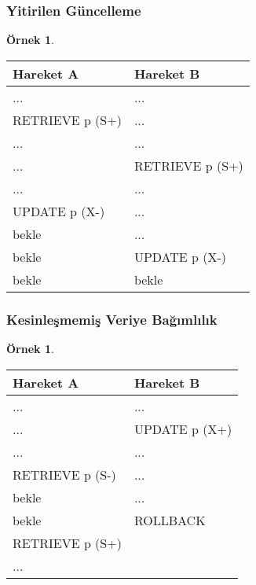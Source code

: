 \documentclass[dvipsnames]{beamer}
\theoremstyle{definition}
\theoremstyle{example}
\newtheorem{ornek}[theorem]{Örnek}
\theoremstyle{plain}
\begin{document}
\begin{frame}[fragile]
  \frametitle{Yitirilen Güncelleme}

  \begin{ornek}
    \begin{table}
      \begin{tabular}{ll}
Hareket A       & Hareket B      \\\hline
...             & ...            \\\pause
RETRIEVE p (S+) & ...            \\\pause
...             & ...            \\
...             & RETRIEVE p (S+)\\\pause
...             & ...            \\
UPDATE p (X-)   & ...            \\
bekle           & ...            \\\pause
bekle           & UPDATE p (X-)  \\
bekle           & bekle
      \end{tabular}
    \end{table}
  \end{ornek}
\end{frame}

\begin{frame}[fragile]
  \frametitle{Kesinleşmemiş Veriye Bağımlılık}

  \begin{ornek}
    \begin{table}
      \begin{tabular}{ll}
Hareket A       & Hareket B    \\\hline
...             & ...          \\\pause
...             & UPDATE p (X+)\\\pause
...             & ...          \\
RETRIEVE p (S-) & ...          \\
bekle           & ...          \\\pause
bekle           & ROLLBACK     \\
RETRIEVE p (S+) &              \\
...             &
      \end{tabular}
    \end{table}
  \end{ornek}
\end{frame}
\end{document}
